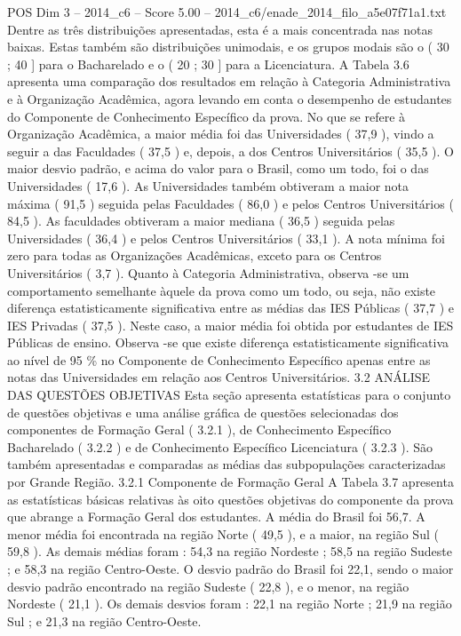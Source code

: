 \begin{textsample}{POS Dim 3 – 2014\_c6 – Score 5.00 – 2014\_c6/enade\_2014\_filo\_a5e07f71a1.txt}
Dentre as três distribuições apresentadas, esta é a mais concentrada nas notas baixas.
Estas também são distribuições unimodais, e os grupos modais são o ( 30 ; 40 ] para o Bacharelado e o ( 20 ; 30 ] para a Licenciatura.
A Tabela 3.6 apresenta uma comparação dos resultados em relação à Categoria Administrativa e à Organização Acadêmica, agora levando em conta o desempenho de estudantes do Componente de Conhecimento Específico da prova.
No que se refere à Organização Acadêmica, a maior média foi das Universidades ( 37,9 ), vindo a seguir a das Faculdades ( 37,5 ) e, depois, a dos Centros Universitários ( 35,5 ).
O maior desvio padrão, e acima do valor para o Brasil, como um todo, foi o das Universidades ( 17,6 ).
As Universidades também obtiveram a maior nota máxima ( 91,5 ) seguida pelas Faculdades ( 86,0 ) e pelos Centros Universitários ( 84,5 ).
As faculdades obtiveram a maior mediana ( 36,5 ) seguida pelas Universidades ( 36,4 ) e pelos Centros Universitários ( 33,1 ).
A nota mínima foi zero para todas as Organizações Acadêmicas, exceto para os Centros Universitários ( 3,7 ).
Quanto à Categoria Administrativa, observa -se um comportamento semelhante àquele da prova como um todo, ou seja, não existe diferença estatisticamente significativa entre as médias das IES Públicas ( 37,7 ) e IES Privadas ( 37,5 ).
Neste caso, a maior média foi obtida por estudantes de IES Públicas de ensino.
Observa -se que existe diferença estatisticamente significativa ao nível de 95 \% no Componente de Conhecimento Específico apenas entre as notas das Universidades em relação aos Centros Universitários. 3.2 ANÁLISE DAS QUESTÕES OBJETIVAS Esta seção apresenta estatísticas para o conjunto de questões objetivas e uma análise gráfica de questões selecionadas dos componentes de Formação Geral ( 3.2.1 ), de Conhecimento Específico Bacharelado ( 3.2.2 ) e de Conhecimento Específico Licenciatura ( 3.2.3 ).
São também apresentadas e comparadas as médias das subpopulações caracterizadas por Grande Região. 3.2.1 Componente de Formação Geral A Tabela 3.7 apresenta as estatísticas básicas relativas às oito questões objetivas do componente da prova que abrange a Formação Geral dos estudantes.
A média do Brasil foi 56,7.
A menor média foi encontrada na região Norte ( 49,5 ), e a maior, na região Sul ( 59,8 ).
As demais médias foram : 54,3 na região Nordeste ; 58,5 na região Sudeste ; e 58,3 na região Centro-Oeste.
O desvio padrão do Brasil foi 22,1, sendo o maior desvio padrão encontrado na região Sudeste ( 22,8 ), e o menor, na região Nordeste ( 21,1 ).
Os demais desvios foram : 22,1 na região Norte ; 21,9 na região Sul ; e 21,3 na região Centro-Oeste.

\end{textsample}
